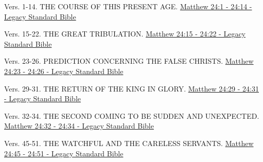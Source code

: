 \documentclass[
  ignorenonframetext,
]{beamer}
\begin{document}
\begin{frame}{24}
\label{section-157}
\begin{block}{Vers. 1-14. THE COURSE OF THIS PRESENT AGE.}
\label{vers.-1-14.-the-course-of-this-present-age.}
\href{https://read.lsbible.org/?q=matt24\%3A1-14}{Matthew 24:1 - 24:14 -
Legacy Standard Bible}
\end{block}

\begin{block}{Vers. 15-22. THE GREAT TRIBULATION.}
\label{vers.-15-22.-the-great-tribulation.}
\href{https://read.lsbible.org/?q=matt24\%3A15-22}{Matthew 24:15 - 24:22
- Legacy Standard Bible}
\end{block}

\begin{block}{Vers. 23-26. PREDICTION CONCERNING THE FALSE CHRISTS.}
\label{vers.-23-26.-prediction-concerning-the-false-christs.}
\href{https://read.lsbible.org/?q=matt24\%3A23-26}{Matthew 24:23 - 24:26
- Legacy Standard Bible}
\end{block}

\begin{block}{Vers. 29-31. THE RETURN OF THE KING IN GLORY.}
\label{vers.-29-31.-the-return-of-the-king-in-glory.}
\href{https://read.lsbible.org/?q=matt24\%3A29-31}{Matthew 24:29 - 24:31
- Legacy Standard Bible}
\end{block}

\begin{block}{Vers. 32-34. THE SECOND COMING TO BE SUDDEN AND
UNEXPECTED.}
\label{vers.-32-34.-the-second-coming-to-be-sudden-and-unexpected.}
\href{https://read.lsbible.org/?q=matt24\%3A32-34}{Matthew 24:32 - 24:34
- Legacy Standard Bible}
\end{block}

\begin{block}{Vers. 45-51. THE WATCHFUL AND THE CARELESS SERVANTS.}
\label{vers.-45-51.-the-watchful-and-the-careless-servants.}
\href{https://read.lsbible.org/?q=matt24\%3A45-51}{Matthew 24:45 - 24:51
- Legacy Standard Bible}
\end{block}
\end{frame}
\end{document}
